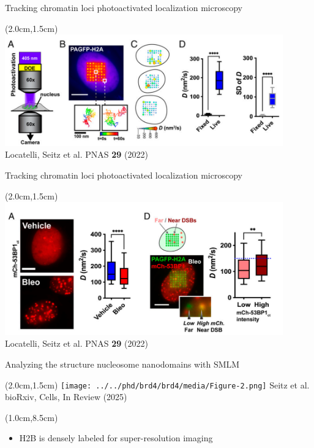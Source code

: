 \documentclass{beamer}					%
\begin{document}
\begin{frame}{Tracking chromatin loci photoactivated localization microscopy}
\begin{textblock*}{12cm}(2.0cm,1.5cm)
\includegraphics[width=12cm]{../../postdoc/sartorius/media/DOE.png}
Locatelli, Seitz et al. PNAS \textbf{29} (2022)
\end{textblock*}
\end{frame}

\begin{frame}{Tracking chromatin loci photoactivated localization microscopy}
\begin{textblock*}{12cm}(2.0cm,1.5cm)
\includegraphics[width=12cm]{../../postdoc/sartorius/media/Bleo.png}
Locatelli, Seitz et al. PNAS \textbf{29} (2022)
\end{textblock*}
\end{frame}


\begin{frame}{Analyzing the structure nucleosome nanodomains with SMLM}
\begin{textblock*}{10cm}(2.0cm,1.5cm)
\texttt{[image: ../../phd/brd4/brd4/media/Figure-2.png]}
Seitz et al. bioRxiv, Cells, In Review (2025)
\end{textblock*}

\begin{textblock*}{13cm}(1.0cm,8.5cm)
\begin{itemize}
\item H2B is densely labeled for super-resolution imaging
\end{itemize}
\end{textblock*}
\end{frame}
\end{document}
